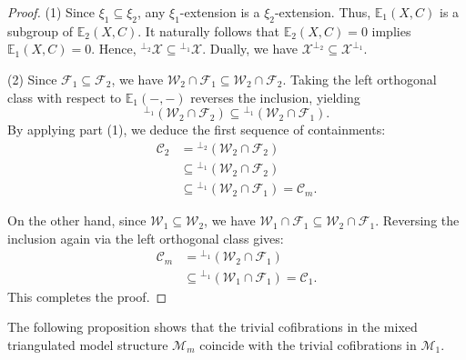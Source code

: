 \documentclass[11pt,a4paper]{amsart}
\numberwithin{equation}{section}
\theoremstyle{plain}
\begin{document}
\begin{proof}
	(1) Since $\xi_1 \subseteq \xi_2$, any $\xi_1$-extension is a $\xi_2$-extension. Thus, $\mathbb{E}_{1}(X,C)$ is a subgroup of $\mathbb{E}_{2}(X,C)$. It naturally follows that $\mathbb{E}_{2}(X,C)=0$ implies $\mathbb{E}_{1}(X,C)=0$. Hence, ${}^{\perp_2}\mathcal{X}\subseteq {}^{\perp_1}\mathcal{X}$. Dually, we have $\mathcal{X}^{\perp_2}\subseteq \mathcal{X}^{\perp_1}$.
	
	(2) Since $\mathcal{F}_1\subseteq \mathcal{F}_2$, we have $\mathcal{W}_2\cap\mathcal{F}_1 \subseteq \mathcal{W}_2\cap\mathcal{F}_2$. Taking the left orthogonal class with respect to $\mathbb{E}_{1}(-,-)$ reverses the inclusion, yielding
	\[ {}^{\perp_1}(\mathcal{W}_2\cap\mathcal{F}_2) \subseteq {}^{\perp_1}(\mathcal{W}_2\cap\mathcal{F}_1). \]
	By applying part (1), we deduce the first sequence of containments:
	\begin{align*}
		\mathcal{C}_2 &= {}^{\perp_2}(\mathcal{W}_2\cap\mathcal{F}_2) \\
		&\subseteq {}^{\perp_1}(\mathcal{W}_2\cap\mathcal{F}_2) \\
		&\subseteq {}^{\perp_1}(\mathcal{W}_2\cap\mathcal{F}_1) = \mathcal{C}_m.
	\end{align*}
	
	On the other hand, since $\mathcal{W}_1 \subseteq \mathcal{W}_2$, we have $\mathcal{W}_1\cap\mathcal{F}_1 \subseteq \mathcal{W}_2\cap\mathcal{F}_1$. Reversing the inclusion again via the left orthogonal class gives:
	\begin{align*}
		\mathcal{C}_m &= {}^{\perp_1}(\mathcal{W}_2\cap\mathcal{F}_1) \\
		&\subseteq {}^{\perp_1}(\mathcal{W}_1\cap\mathcal{F}_1) = \mathcal{C}_1.
	\end{align*}
	This completes the proof.
\end{proof}




The following proposition shows that the trivial cofibrations in the mixed triangulated model structure \(\mathcal{M}_m\) coincide with the trivial cofibrations in \(\mathcal{M}_1\).
\end{document}
